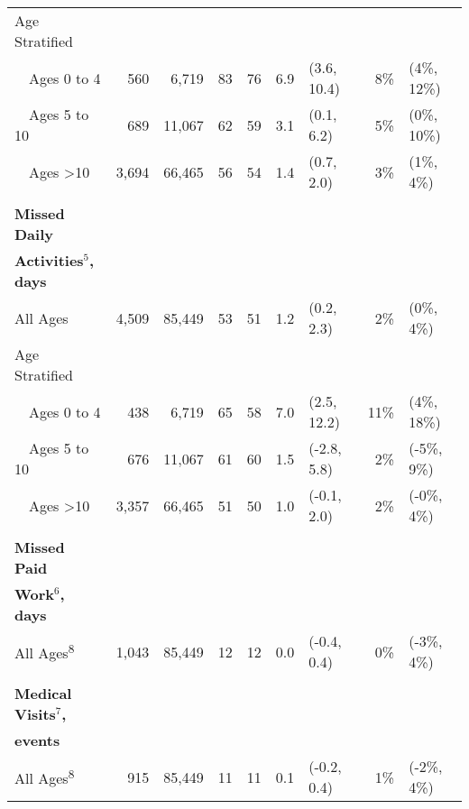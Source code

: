 \documentclass[12pt]{article}\usepackage[]{graphicx}\usepackage[]{color}
\begin{document}
\begin{table}[h!tb]
\begin{footnotesize}
\begin{center}
\begin{tabular}{l rr cc rl rl}
Age Stratified \\
 ~~Ages 0 to 4 & 560 & 6,719 & 83 & 76 & 6.9 & (3.6, 10.4) & 8\% & (4\%, 12\%) \\ 
 ~~Ages 5 to 10 & 689 & 11,067 & 62 & 59 & 3.1 & (0.1, 6.2) & 5\% & (0\%, 10\%) \\ 
 ~~Ages >10 & 3,694 & 66,465 & 56 & 54 & 1.4 & (0.7, 2.0) & 3\% & (1\%, 4\%) \\ 
  
& \\
\textbf{Missed Daily} \\
\textbf{Activities$^5$, days} \\
 All Ages & 4,509 & 85,449 & 53 & 51 & 1.2 & (0.2, 2.3) & 2\% & (0\%, 4\%) \\ 
  
Age Stratified \\
 ~~Ages 0 to 4 & 438 & 6,719 & 65 & 58 & 7.0 & (2.5, 12.2) & 11\% & (4\%, 18\%) \\ 
 ~~Ages 5 to 10 & 676 & 11,067 & 61 & 60 & 1.5 & (-2.8, 5.8) & 2\% & (-5\%, 9\%) \\ 
 ~~Ages >10 & 3,357 & 66,465 & 51 & 50 & 1.0 & (-0.1, 2.0) & 2\% & (-0\%, 4\%) \\ 
  
& \\
\textbf{Missed Paid} \\
\textbf{Work$^6$, days} \\
 All Ages\textsuperscript{8} & 1,043 & 85,449 & 12 & 12 & 0.0 & (-0.4, 0.4) & 0\% & (-3\%, 4\%) \\ 
  
& \\
\textbf{Medical Visits$^7$,} \\
\textbf{events} \\
 All Ages\textsuperscript{8} & 915 & 85,449 & 11 & 11 & 0.1 & (-0.2, 0.4) & 1\% & (-2\%, 4\%) \\ 
  

\end{tabular}
\end{center}
\end{footnotesize}
\end{table}
\end{document}
